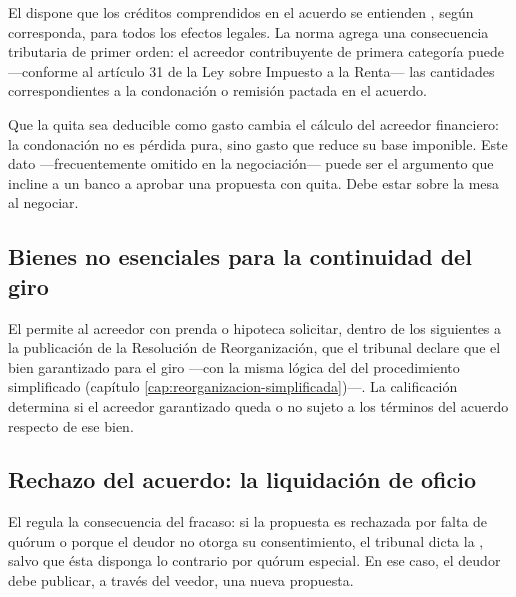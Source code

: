 El  dispone que los créditos comprendidos en el acuerdo se entienden , según corresponda, para todos los efectos legales. La norma agrega una
consecuencia tributaria de primer orden: el acreedor contribuyente de primera categoría puede
 ---conforme al artículo 31  de la Ley sobre Impuesto a la Renta--- las cantidades
correspondientes a la condonación o remisión pactada en el acuerdo.

\begin{foco}
Que la quita sea deducible como gasto cambia el cálculo del acreedor financiero: la condonación
no es pérdida pura, sino gasto que reduce su base imponible. Este dato ---frecuentemente omitido
en la negociación--- puede ser el argumento que incline a un banco a aprobar una propuesta con
quita. Debe estar sobre la mesa al negociar.
\end{foco}

\subsection{Bienes no esenciales para la continuidad del giro}

El  permite al acreedor con prenda o hipoteca solicitar, dentro de los  siguientes a la publicación de la Resolución de Reorganización, que el tribunal declare
que el bien garantizado  para el giro ---con la misma lógica del
 del procedimiento simplificado (capítulo \ref{cap:reorganizacion-simplificada})---.
La calificación determina si el acreedor garantizado queda o no sujeto a los términos del
acuerdo respecto de ese bien.

\subsection{Rechazo del acuerdo: la liquidación de oficio}

El  regula la consecuencia del fracaso: si la propuesta es rechazada por falta de
quórum o porque el deudor no otorga su consentimiento, el tribunal dicta la
, salvo que
ésta disponga lo contrario por quórum especial. En ese caso, el deudor debe publicar, a través
del veedor, una nueva propuesta.

